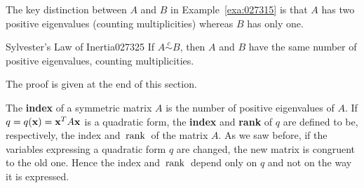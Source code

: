 The key distinction between $A$ and $B$ in Example~\ref{exa:027315} is that $A$ has two positive eigenvalues (counting multiplicities) whereas $B$ has only one.


\begin{theorem}{Sylvester's Law of Inertia}{027325}
If $A \stackrel{c}{\sim} B$, then $A$ and $B$ have the same number of positive eigenvalues, counting multiplicities.
\end{theorem}

\noindent The proof is given at the end of this section.


The \textbf{index} of a symmetric matrix $A$ is the number of positive eigenvalues of $A$. If $q = q(\textbf{x}) = \textbf{x}^{T}A\textbf{x}$ is a quadratic form, the \textbf{index} and \textbf{rank} of $q$ are defined to be, respectively, the index and $\thinspace\operatorname{rank\medspace}$ of the matrix $A$. As we saw before, if the variables expressing a quadratic form $q$ are changed, the new matrix is congruent to the old one. Hence the index and $\thinspace\operatorname{rank\medspace}$ depend only on $q$ and not on the way it is expressed.


